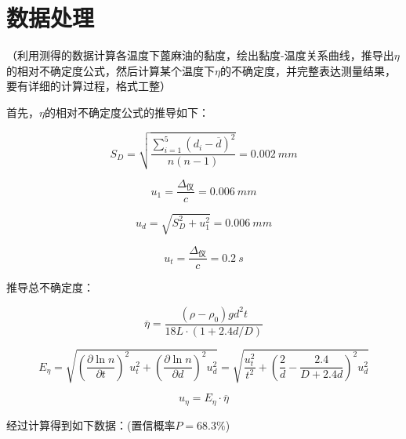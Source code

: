 \documentclass{ctexart}
\begin{document}

\newpage

\section{数据处理}

（利用测得的数据计算各温度下蓖麻油的黏度，绘出黏度-温度关系曲线，推导出$\eta$的相对不确定度公式，然后计算某个温度下$\eta$的不确定度，并完整表达测量结果，要有详细的计算过程，格式工整）

首先，$\eta$的相对不确定度公式的推导如下：


$$ S_{D} = \sqrt{\frac{\displaystyle\sum_{i=1}^{5}(d_i-\overline{d})^2}{n(n-1)}} = 0.002\  mm $$

$$ u_1 = \frac{\Delta_{\text{仪}}}{c} = 0.006 \  mm $$

$$ u_d = \sqrt{S_{D}^2 + u_1^2} = 0.006 \ mm $$

$$ u_t = \frac{\Delta_{\text{仪}}}{c} = 0.2\ s $$

推导总不确定度：

$$ \overline{\eta} = \frac{(\rho-\rho_0)gd^2t}{18L\cdot (1+2.4d/D)} $$

$$ E_\eta = \sqrt{\left(\frac{\partial \ln{n}}{\partial t}\right)^2u_t^2+\left(\frac{\partial \ln{n}}{\partial d}\right)^2u_d^2}= \sqrt{\frac{u_t^2}{t^2}+\left(\frac{2}{d} - \frac{2.4}{D+2.4d}\right)^2u_d^2} $$

$$ u_\eta = E_\eta \cdot \overline{\eta} $$

经过计算得到如下数据：(置信概率$P=68.3\%$)
\end{document}
